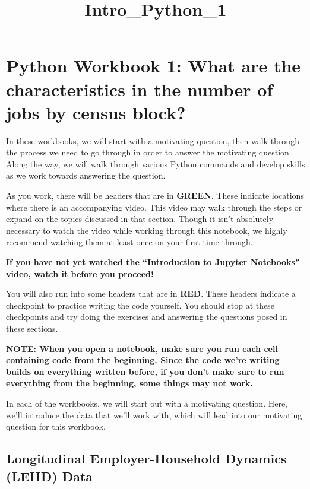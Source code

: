 \documentclass[11pt]{article}
\title{Intro\_Python\_1}
\begin{document}
    
    
    \maketitle
    
    

    
    \hypertarget{python-workbook-1-what-are-the-characteristics-in-the-number-of-jobs-by-census-block}{%
\section{Python Workbook 1: What are the characteristics in the number
of jobs by census
block?}\label{python-workbook-1-what-are-the-characteristics-in-the-number-of-jobs-by-census-block}}

    In these workbooks, we will start with a motivating question, then walk
through the process we need to go through in order to answer the
motivating question. Along the way, we will walk through various Python
commands and develop skills as we work towards answering the question.

As you work, there will be headers that are in \textbf{{GREEN}}. These
indicate locations where there is an accompanying video. This video may
walk through the steps or expand on the topics discussed in that
section. Though it isn't absolutely necessary to watch the video while
working through this notebook, we highly recommend watching them at
least once on your first time through.

\textbf{{If you have not yet watched the ``Introduction to Jupyter
Notebooks'' video, watch it before you proceed!}}

You will also run into some headers that are in \textbf{{RED}}. These
headers indicate a checkpoint to practice writing the code yourself. You
should stop at these checkpoints and try doing the exercises and
answering the questions posed in these sections.

\textbf{NOTE: When you open a notebook, make sure you run each cell
containing code from the beginning. Since the code we're writing builds
on everything written before, if you don't make sure to run everything
from the beginning, some things may not work.}

In each of the workbooks, we will start out with a motivating question.
Here, we'll introduce the data that we'll work with, which will lead
into our motivating question for this workbook.

    \hypertarget{longitudinal-employer-household-dynamics-lehd-data}{%
\subsection{Longitudinal Employer-Household Dynamics (LEHD)
Data}\label{longitudinal-employer-household-dynamics-lehd-data}}
\end{document}
